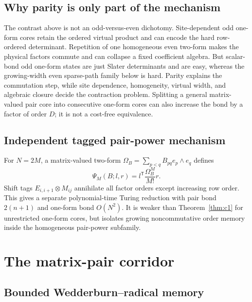 \documentclass[aps,pra,reprint,superscriptaddress,nofootinbib,longbibliography,showkeys]{revtex4-2}
\theoremstyle{definition}
\begin{document}
\subsection{Why parity is only part of the mechanism}

The contrast above is not an odd-versus-even dichotomy.  Site-dependent odd
one-form cores retain the ordered virtual product and can encode the hard
row-ordered determinant.  Repetition of one homogeneous even two-form makes
the physical factors commute and can collapse a fixed coefficient algebra.
But scalar-bond odd one-form states are just Slater determinants and are easy,
whereas the growing-width even sparse-path family below is hard.  Parity
explains the commutation step, while site dependence, homogeneity, virtual
width, and algebraic closure decide the contraction problem.  Splitting a
general matrix-valued pair core into consecutive one-form cores can also
increase the bond by a factor of order $D$; it is not a cost-free equivalence.

\subsection{Independent tagged pair-power mechanism}

For $N=2M$, a matrix-valued two-form
$\Omega_B=\sum_{p<q}B_{pq}e_p\wedge e_q$ defines
\[
 \Psi_M(B;l,r)=l^{\mathsf T}\frac{\Omega_B^M}{M!}r.
\]
Shift tags $E_{i,i+1}\otimes M_{ij}$ annihilate all factor orders except
increasing row order.  This gives a separate polynomial-time Turing reduction
with pair bond $2(n+1)$ and one-form bond $O(N^2)$.  It is weaker than
Theorem~\ref{thm:c1} for unrestricted one-form cores, but isolates growing
noncommutative order memory inside the homogeneous pair-power subfamily.

\section{The matrix-pair corridor}

\subsection{Bounded Wedderburn--radical memory}
\end{document}
